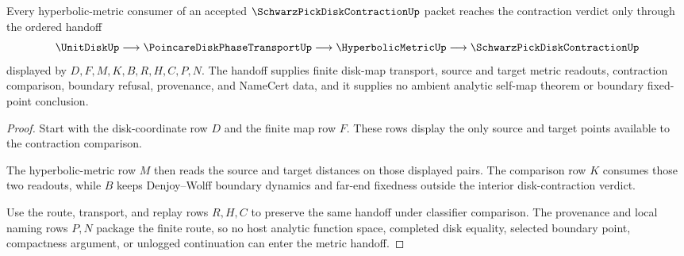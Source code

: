 \begin{theorem}
\label{thm:schwarz-pick-disk-contraction-hyperbolic-metric-handoff}
Every hyperbolic-metric consumer of an accepted $\SchwarzPickDiskContractionUp$ packet reaches the contraction verdict only through the ordered handoff
$$
\UnitDiskUp \longrightarrow \PoincareDiskPhaseTransportUp \longrightarrow \HyperbolicMetricUp \longrightarrow \SchwarzPickDiskContractionUp
$$
displayed by $D,F,M,K,B,R,H,C,P,N$. The handoff supplies finite disk-map transport, source and target metric readouts, contraction comparison, boundary refusal, provenance, and NameCert data, and it supplies no ambient analytic self-map theorem or boundary fixed-point conclusion.
\end{theorem}
\begin{proof}
Start with the disk-coordinate row $D$ and the finite map row $F$. These rows display the only source and target points available to the contraction comparison.

The hyperbolic-metric row $M$ then reads the source and target distances on those displayed pairs. The comparison row $K$ consumes those two readouts, while $B$ keeps Denjoy--Wolff boundary dynamics and far-end fixedness outside the interior disk-contraction verdict.

Use the route, transport, and replay rows $R,H,C$ to preserve the same handoff under classifier comparison. The provenance and local naming rows $P,N$ package the finite route, so no host analytic function space, completed disk equality, selected boundary point, compactness argument, or unlogged continuation can enter the metric handoff.
\end{proof}


\begin{closurestatus}{\SchwarzPickDiskContractionUp}
  \theoryclosure{\seedClosure}
  \formalstatus{\unformalizedV}
\end{closurestatus}

